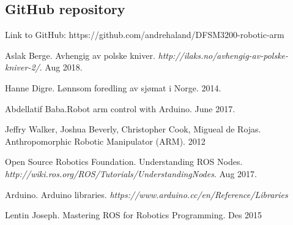 \documentclass[11pt,a4paper, titlepage]{article}
\begin{document}
\begin{appendices}
\section{GitHub repository}
Link to GitHub: https://github.com/andrehaland/DFSM3200-robotic-arm

\end{appendices}

\newpage
	
	
\begin{thebibliography}{1}

 Aslak Berge. Avhengig av polske kniver. \textit{http://ilaks.no/avhengig-av-polske-kniver-2/}. Aug 2018.

 Hanne Digre. Lønnsom foredling av sjømat i Norge. 2014.

 Abdellatif Baba.Robot arm control with Arduino. June 2017.

 Jeffry Walker, Joshua Beverly, Christopher Cook, Migueal de Rojas. Anthropomorphic Robotic Manipulator (ARM). 2012

 Open Source Robotics Foundation. Understanding ROS Nodes.
\textit{http://wiki.ros.org/ROS/Tutorials/UnderstandingNodes}. Aug 2017.

 Arduino. Arduino libraries. \textit{https://www.arduino.cc/en/Reference/Libraries}

 Lentin Joseph. Mastering ROS for Robotics Programming. Des 2015



\newpage	

\end{thebibliography}	
	
\end{document}
